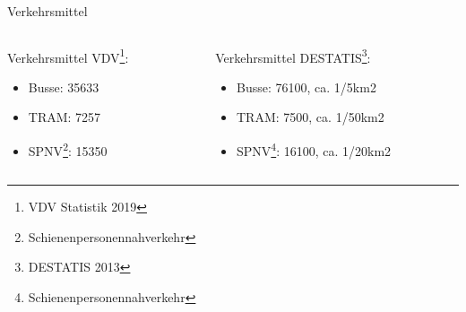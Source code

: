 
\begin{frame}{Verkehrsmittel}
  \begin{columns}

    \begin{column}{0.5\textwidth}
      \minipage[c][0.65\textheight][s]{\columnwidth}
      Verkehrsmittel VDV\footnote{VDV Statistik 2019}:
      \begin{itemize}
      \item Busse: 35633
      \item TRAM: 7257
      \item SPNV\footnote{Schienenpersonennahverkehr}: 15350
      \end{itemize}
      \endminipage
    
    \end{column}

    \begin{column}{0.5\textwidth}
      \minipage[c][0.65\textheight][s]{\columnwidth}
    Verkehrsmittel DESTATIS\footnote{DESTATIS 2013}:
    \begin{itemize}
    \item Busse: 76100, ca. 1/5km2
    \item TRAM: 7500, ca. 1/50km2
    \item SPNV\footnote{Schienenpersonennahverkehr}: 16100, ca. 1/20km2
    \end{itemize}
    \endminipage
    \end{column}

  \end{columns}
\end{frame}

